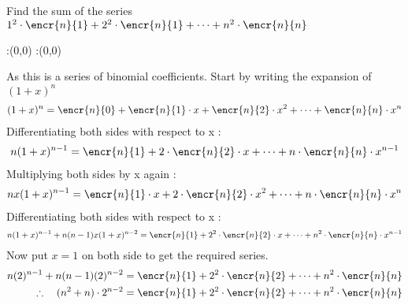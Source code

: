 \question Find the sum of the series \\
$1^2 \cdot \encr{n}{1} + 2^2 \cdot \encr{n}{1} + \cdots + n^2 \cdot \encr{n}{n} $

\insertQR{}


\ifprintanswers
  \begin{marginfigure}
      :(0,0)
      :(0,0)
    \figdrawbegin{}
      \figdrawline [100,101]
    \figdrawend
    \figvisu{\figBoxA}{}{%
    }
    \centerline{\box\figBoxA}
  \end{marginfigure}
\fi 

\begin{solution}
As this is a series of binomial coefficients. Start by writing the expansion of $(1+x)^n$ \\
\begin{align}
(1+x)^{n} = \encr{n}{0} + \encr{n}{1} \cdot x + \encr{n}{2} \cdot {x}^{2} + \cdots + \encr{n}{n} \cdot {x}^{n}  
\end{align}  
Differentiating both sides with respect to x : \\
\begin{align}
n(1+x)^{n-1} =  \encr{n}{1} + 2 \cdot \encr{n}{2} \cdot x + \cdots + n \cdot \encr{n}{n} \cdot {x}^{n-1}
\end{align}  
Multiplying both sides by x again : \\
\begin{align}
nx(1+x)^{n-1} =  \encr{n}{1} \cdot x + 2 \cdot \encr{n}{2} \cdot x^2 + \cdots + n \cdot \encr{n}{n} \cdot {x}^{n}
\end{align}
Differentiating both sides with respect to x : \\
\begin{align}
n(1+x)^{n-1} + n(n-1)x(1+x)^{n-2} =  \encr{n}{1} + 2^2 \cdot \encr{n}{2} \cdot x + \cdots + n^2 \cdot \encr{n}{n} \cdot {x}^{n-1}
\end{align}
Now put $x=1$ on both side to get the required series. 
\begin{align}
n(2)^{n-1} + n(n-1)(2)^{n-2} &=  \encr{n}{1} + 2^2 \cdot \encr{n}{2}  + \cdots + n^2 \cdot \encr{n}{n} \\
\therefore \quad (n^2 + n)\cdot 2 ^{n-2} &= \encr{n}{1} + 2^2 \cdot \encr{n}{2}  + \cdots + n^2 \cdot \encr{n}{n}
\end{align} 
\end{solution}


